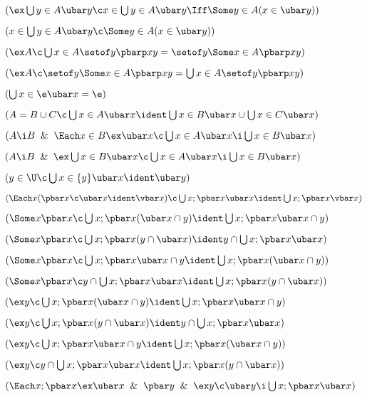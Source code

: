  $(\ex \bigcup y \in A \ubar  y \c
x \in \bigcup y \in A \ubar y \Iff \Some y \in A (x \in \ubar y))$

 $(x \in \bigcup y \in A \ubar  y \c
\Some y \in A (x \in \ubar y))$

 $(\ex A \c \bigcup x \in A \setof y \pbarp xy
=\setof y \Some x \in A \pbarp xy)$

 $(\ex A \c 
\setof y \Some x \in A \pbarp xy =
\bigcup x \in A \setof y \pbarp xy)$

 $(\bigcup x \in \e \ubar x = \e)$

 $(A = B \cup C \c
\bigcup x \in A \ubar x \ident \bigcup x \in B\ubar x\cup\bigcup x \in C\ubar x)$

 $(A \i B  \And \Each x \in B \ex \ubar x \c
\bigcup x \in A \ubar x \i \bigcup x \in B\ubar x)$

 $(A \i B  \And \ex\bigcup x \in B \ubar x \c
\bigcup x \in A \ubar x \i \bigcup x \in B\ubar x)$

 $(y \in \U \c
\bigcup x \in \{y\} \ubar x \ident \ubar y)$

 $(\Each x (\pbar x \c \ubar x \ident \vbar x)
\c \bigcup x ; \pbar x \ubar x \ident \bigcup x;\pbar x\vbar x)$

 $(\Some x  \pbar x \c \bigcup x;\pbar x
(\ubar x \cap y)\ident\bigcup x;\pbar x\ubar x\cap y)$

 $(\Some x  \pbar x \c \bigcup x;\pbar x
(y\cap\ubar x)\ident y\cap\bigcup x;\pbar x\ubar x)$

 $(\Some x  \pbar x \c 
\bigcup x;\pbar x\ubar x\cap y
\ident \bigcup x;\pbar x (\ubar x \cap y) )$

 $(\Some x  \pbar x \c 
y\cap\bigcup x;\pbar x\ubar x \ident \bigcup x;\pbar x
(y\cap\ubar x) )$

 $(\ex y \c \bigcup x;\pbar x
(\ubar x \cap y)\ident\bigcup x;\pbar x\ubar x\cap y)$

 $(\ex y \c \bigcup x;\pbar x
(y\cap\ubar x)\ident y\cap\bigcup x;\pbar x\ubar x)$

 $(\ex y \c
\bigcup x;\pbar x\ubar x\cap y
\ident \bigcup x;\pbar x (\ubar x \cap y) )$

 $(\ex y \c
y\cap\bigcup x;\pbar x\ubar x \ident \bigcup x;\pbar x
(y\cap\ubar x) )$

 $(\Each x;\pbar x \ex\ubar x \And \pbar y \And
\ex y \c \ubar y \i \bigcup x;\pbar x \ubar x)$

